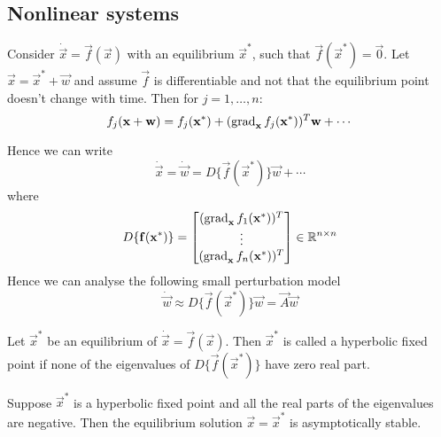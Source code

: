 \subsection{Nonlinear systems}
Consider $\dot{\vec x} = \vec f(\vec x)$ with an equilibrium $\vec x^\ast$, such that $\vec f(\vec x^\ast) = \vec 0$. Let $\vec x = \vec x^\ast + \vec w$ and assume $\vec f$ is differentiable and not that the equilibrium point doesn't change with time. Then for $j = 1, \dotsc, n$:
\begin{equation*}
	f_j(\boldsymbol{\mathbf{x}} + \boldsymbol{\mathbf{w}}) = f_j(\boldsymbol{\mathbf{x}}^\ast) + (\operatorname{grad}_{\boldsymbol{\mathbf{x}}} f_j(\boldsymbol{\mathbf{x}}^\ast))^T \boldsymbol{\mathbf{w}} + \cdots
\end{equation*}

Hence we can write
\begin{equation*}
	\dot{\vec x} = \dot{\vec w} = D\{\vec f(\vec x^\ast)\} \vec w + \cdots
\end{equation*}
where
\begin{equation*}
	D\{\boldsymbol{\mathbf{f}}(\boldsymbol{\mathbf{x}}^\ast)\} =
		\begin{bmatrix}
			(\operatorname{grad}_{\boldsymbol{\mathbf{x}}} f_1(\boldsymbol{\mathbf{x}}^\ast))^T \\
			\vdots \\
			(\operatorname{grad}_{\boldsymbol{\mathbf{x}}} f_n(\boldsymbol{\mathbf{x}}^\ast))^T \\
		\end{bmatrix} \in \mathbb R^{n \times n}
\end{equation*}
Hence we can analyse the following small perturbation model
\begin{equation*}
	\dot{\vec w} \approx D\{\vec f(\vec x^\ast)\} \vec w = \vec A \vec w
\end{equation*}

\begin{definition}
	Let $\vec x^\ast$ be an equilibrium of $\dot{\vec x} = \vec f(\vec x)$. Then $\vec x^\ast$ is called a hyperbolic fixed point if none of the eigenvalues of $D\{\vec f(\vec x^\ast)\}$ have zero real part.
\end{definition}

\begin{theorem}
	Suppose $\vec x^\ast$ is a hyperbolic fixed point and all the real parts of the eigenvalues are negative. Then the equilibrium solution $\vec x = \vec x^\ast$ is asymptotically stable.
\end{theorem}